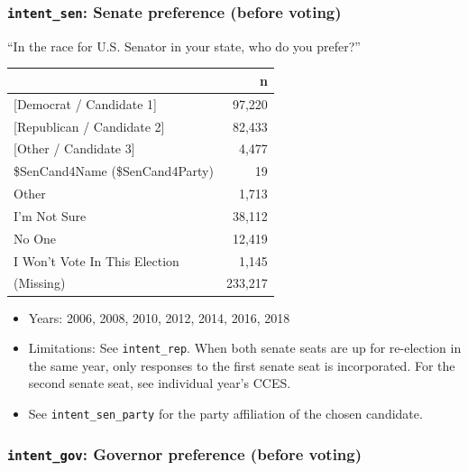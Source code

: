 \documentclass[10pt,article,oneside]{memoir}
\theoremstyle{definition}
\begin{document}
\hypertarget{intent_sen-senate-preference-before-voting}{%
\subsubsection{\texorpdfstring{\texttt{intent\_sen}: Senate preference
(before
voting)}{intent\_sen: Senate preference (before voting)}}\label{intent_sen-senate-preference-before-voting}}

``In the race for U.S. Senator in your state, who do you prefer?''

\begin{table}[H]
\centering
\begin{tabular}{lr}
\toprule
 & n\\
\midrule
{[Democrat / Candidate 1]} & 97,220\\
{[Republican / Candidate 2]} & 82,433\\
{[Other / Candidate 3]} & 4,477\\
\$SenCand4Name (\$SenCand4Party) & 19\\
Other & 1,713\\
I'm Not Sure & 38,112\\
No One & 12,419\\
I Won't Vote In This Election & 1,145\\
(Missing) & 233,217\\
\bottomrule
\end{tabular}
\end{table}

\begin{itemize}
\tightlist
\item
  Years: 2006, 2008, 2010, 2012, 2014, 2016, 2018
\item
  Limitations: See \texttt{intent\_rep}. When both senate seats are up
  for re-election in the same year, only responses to the first senate
  seat is incorporated. For the second senate seat, see individual
  year's CCES.
\item
  See \texttt{intent\_sen\_party} for the party affiliation of the
  chosen candidate.
\end{itemize}

\hypertarget{intent_gov-governor-preference-before-voting}{%
\subsubsection{\texorpdfstring{\texttt{intent\_gov}: Governor preference
(before
voting)}{intent\_gov: Governor preference (before voting)}}\label{intent_gov-governor-preference-before-voting}}
\end{document}
